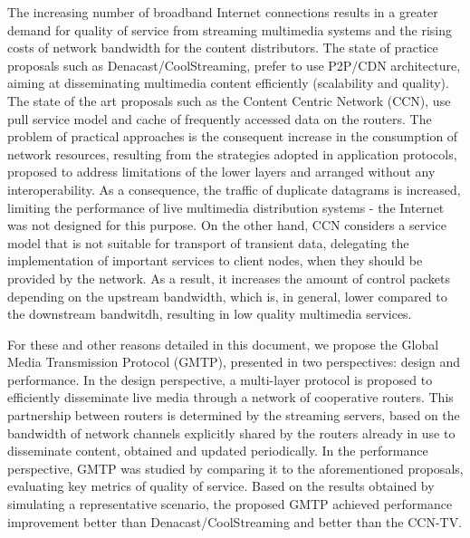 The increasing number of broadband Internet connections results in a greater demand for quality of service from streaming multimedia systems and the rising costs of network bandwidth for the content distributors. The state of practice proposals such as Denacast/CoolStreaming, prefer to use P2P/CDN architecture, aiming at disseminating multimedia content efficiently (scalability and quality). The state of the art proposals such as the Content Centric Network (CCN), use pull service model and cache of frequently accessed data on the routers. The problem of practical approaches is the consequent increase in the consumption of network resources, resulting from the strategies adopted in application protocols, proposed to address limitations of the lower layers and arranged without any interoperability. As a consequence, the traffic of duplicate datagrams is increased, limiting the performance of live multimedia distribution systems - the Internet was not designed for this purpose. On the other hand, CCN considers a service model that is not suitable for transport of transient data, delegating the implementation of important services to client nodes, when they should be provided by the network. As a result, it increases the amount of control packets depending on the upstream bandwidth, which is, in general, lower compared to the downstream bandwitdh, resulting in low quality multimedia services.

For these and other reasons detailed in this document, we propose the Global Media Transmission Protocol (GMTP), presented in two perspectives: design and performance. In the design perspective, a multi-layer protocol is proposed to efficiently disseminate live media through a network of cooperative routers. This partnership between routers is determined by the streaming servers, based on the bandwidth of network channels explicitly shared by the routers already in use to disseminate content, obtained and updated periodically. In the performance perspective, GMTP was studied by comparing it to the aforementioned proposals, evaluating key metrics of quality of service. Based on the results obtained by simulating a representative scenario,  the proposed GMTP achieved  performance improvement  better than Denacast/CoolStreaming and  better than the CCN-TV.